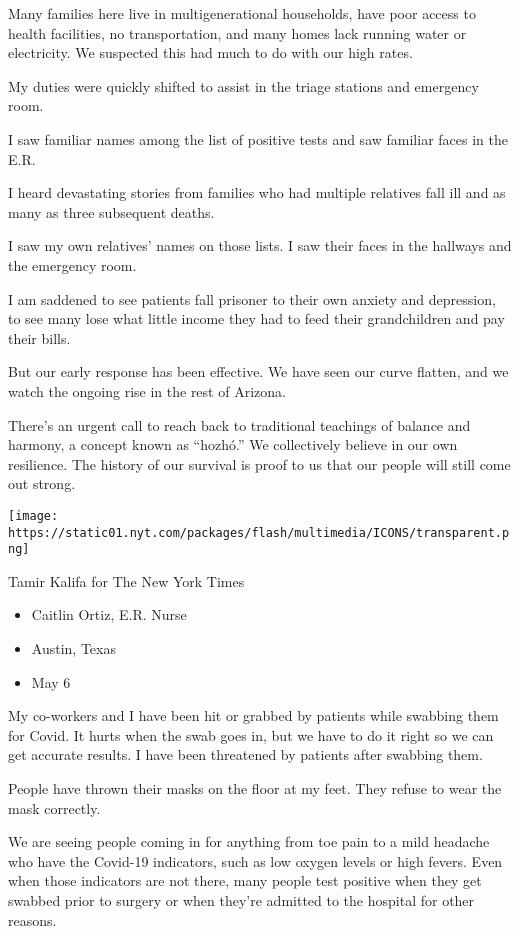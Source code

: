 Many families here live in multigenerational households, have poor
access to health facilities, no transportation, and many homes lack
running water or electricity. We suspected this had much to do with our
high rates.

My duties were quickly shifted to assist in the triage stations and
emergency room.

I saw familiar names among the list of positive tests and saw familiar
faces in the E.R.

I heard devastating stories from families who had multiple relatives
fall ill and as many as three subsequent deaths.

I saw my own relatives' names on those lists. I saw their faces in the
hallways and the emergency room.

I am saddened to see patients fall prisoner to their own anxiety and
depression, to see many lose what little income they had to feed their
grandchildren and pay their bills.

But our early response has been effective. We have seen our curve
flatten, and we watch the ongoing rise in the rest of Arizona.

There's an urgent call to reach back to traditional teachings of balance
and harmony, a concept known as ``hozhó.'' We collectively believe in
our own resilience. The history of our survival is proof to us that our
people will still come out strong.

\texttt{[image: https://static01.nyt.com/packages/flash/multimedia/ICONS/transparent.png]}

Tamir Kalifa for The New York Times

\begin{itemize}
\tightlist
\item
  Caitlin Ortiz, E.R. Nurse
\item
  Austin, Texas
\item
  May 6
\end{itemize}

My co-workers and I have been hit or grabbed by patients while swabbing
them for Covid. It hurts when the swab goes in, but we have to do it
right so we can get accurate results. I have been threatened by patients
after swabbing them.

People have thrown their masks on the floor at my feet. They refuse to
wear the mask correctly.

We are seeing people coming in for anything from toe pain to a mild
headache who have the Covid-19 indicators, such as low oxygen levels or
high fevers. Even when those indicators are not there, many people test
positive when they get swabbed prior to surgery or when they're admitted
to the hospital for other reasons.

